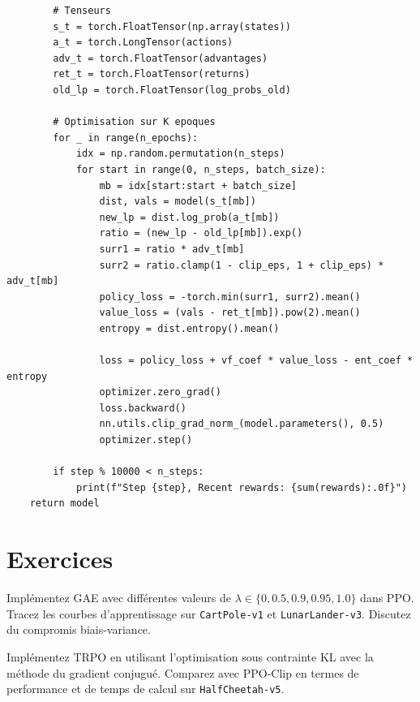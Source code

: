 \begin{codeblock}[title=\textbf{PPO --- Boucle d'entra\^inement}]
\begin{verbatim}
        # Tenseurs
        s_t = torch.FloatTensor(np.array(states))
        a_t = torch.LongTensor(actions)
        adv_t = torch.FloatTensor(advantages)
        ret_t = torch.FloatTensor(returns)
        old_lp = torch.FloatTensor(log_probs_old)

        # Optimisation sur K epoques
        for _ in range(n_epochs):
            idx = np.random.permutation(n_steps)
            for start in range(0, n_steps, batch_size):
                mb = idx[start:start + batch_size]
                dist, vals = model(s_t[mb])
                new_lp = dist.log_prob(a_t[mb])
                ratio = (new_lp - old_lp[mb]).exp()
                surr1 = ratio * adv_t[mb]
                surr2 = ratio.clamp(1 - clip_eps, 1 + clip_eps) * adv_t[mb]
                policy_loss = -torch.min(surr1, surr2).mean()
                value_loss = (vals - ret_t[mb]).pow(2).mean()
                entropy = dist.entropy().mean()

                loss = policy_loss + vf_coef * value_loss - ent_coef * entropy
                optimizer.zero_grad()
                loss.backward()
                nn.utils.clip_grad_norm_(model.parameters(), 0.5)
                optimizer.step()

        if step % 10000 < n_steps:
            print(f"Step {step}, Recent rewards: {sum(rewards):.0f}")
    return model
\end{verbatim}
\end{codeblock}

\section{Exercices}

\begin{exercice}[GAE]
Impl\'ementez GAE avec diff\'erentes valeurs de $\lambda \in \{0, 0.5, 0.9, 0.95, 1.0\}$
dans PPO. Tracez les courbes d'apprentissage sur \texttt{CartPole-v1} et
\texttt{LunarLander-v3}. Discutez du compromis biais-variance.
\end{exercice}

\begin{exercice}
Impl\'ementez TRPO en utilisant l'optimisation sous contrainte KL avec la m\'ethode
du gradient conjugu\'e. Comparez avec PPO-Clip en termes de performance et de
temps de calcul sur \texttt{HalfCheetah-v5}.
\end{exercice}


